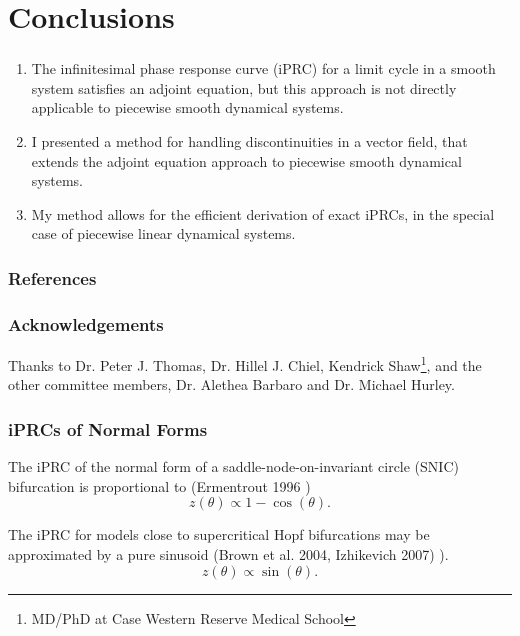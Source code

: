 \documentclass{beamer}
\begin{document}
\section{Conclusions}
\begin{frame}
 \frametitle{\insertsection}
 \begin{enumerate}
 \item The infinitesimal phase response curve (iPRC) for a limit cycle in a smooth system satisfies an adjoint equation, but this approach is not directly applicable to piecewise smooth dynamical systems.

 \item I presented a method for handling discontinuities in a vector field, that extends the adjoint equation approach to piecewise smooth dynamical systems.

 \item My method allows for the efficient derivation of exact iPRCs, in the special case of piecewise linear dynamical systems.
\end{enumerate}

\end{frame}



\begin{frame}[allowframebreaks]
        \frametitle{References}
        
        
\end{frame}



\begin{frame}
\frametitle{Acknowledgements}
Thanks to Dr. Peter J. Thomas, Dr. Hillel J. Chiel, Kendrick Shaw\footnote{MD/PhD at Case Western Reserve Medical School}, and the other committee members, Dr. Alethea Barbaro and Dr. Michael Hurley.
\end{frame}

\begin{frame}
\frametitle{iPRCs of Normal Forms}
The iPRC of the normal form of a saddle-node-on-invariant circle (SNIC) bifurcation is proportional to (Ermentrout 1996 \cite{Ermentrout1996NeuralComput})
\begin{equation}
z(\theta) \propto 1-\cos(\theta).
\end{equation}

The iPRC for models close to supercritical Hopf bifurcations may be approximated by a pure sinusoid (Brown et al. 2004, Izhikevich 2007) \cite{BrownMoehlisHolmes:2004:NeComp,Izhikevich2007}).
\begin{equation}
z(\theta) \propto \sin(\theta).
\end{equation}
\end{frame}
\end{document}
